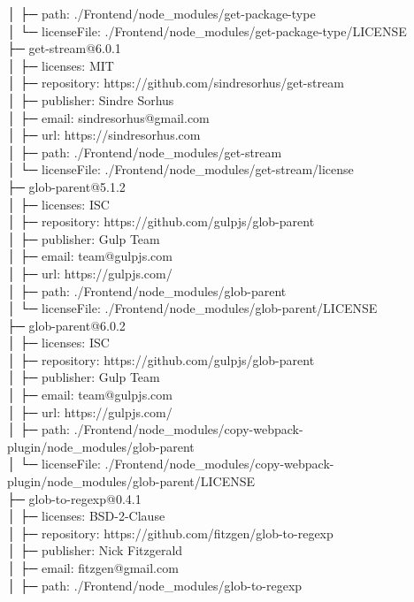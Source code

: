 │  ├─ path: ./Frontend/node\_modules/get-package-type\\
│  └─ licenseFile: ./Frontend/node\_modules/get-package-type/LICENSE\\
├─ get-stream@6.0.1\\
│  ├─ licenses: MIT\\
│  ├─ repository: https://github.com/sindresorhus/get-stream\\
│  ├─ publisher: Sindre Sorhus\\
│  ├─ email: sindresorhus@gmail.com\\
│  ├─ url: https://sindresorhus.com\\
│  ├─ path: ./Frontend/node\_modules/get-stream\\
│  └─ licenseFile: ./Frontend/node\_modules/get-stream/license\\
├─ glob-parent@5.1.2\\
│  ├─ licenses: ISC\\
│  ├─ repository: https://github.com/gulpjs/glob-parent\\
│  ├─ publisher: Gulp Team\\
│  ├─ email: team@gulpjs.com\\
│  ├─ url: https://gulpjs.com/\\
│  ├─ path: ./Frontend/node\_modules/glob-parent\\
│  └─ licenseFile: ./Frontend/node\_modules/glob-parent/LICENSE\\
├─ glob-parent@6.0.2\\
│  ├─ licenses: ISC\\
│  ├─ repository: https://github.com/gulpjs/glob-parent\\
│  ├─ publisher: Gulp Team\\
│  ├─ email: team@gulpjs.com\\
│  ├─ url: https://gulpjs.com/\\
│  ├─ path: ./Frontend/node\_modules/copy-webpack-plugin/node\_modules/glob-parent\\
│  └─ licenseFile: ./Frontend/node\_modules/copy-webpack-plugin/node\_modules/glob-parent/LICENSE\\
├─ glob-to-regexp@0.4.1\\
│  ├─ licenses: BSD-2-Clause\\
│  ├─ repository: https://github.com/fitzgen/glob-to-regexp\\
│  ├─ publisher: Nick Fitzgerald\\
│  ├─ email: fitzgen@gmail.com\\
│  ├─ path: ./Frontend/node\_modules/glob-to-regexp\\
